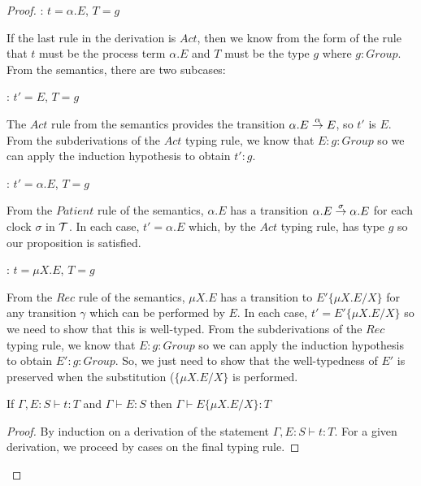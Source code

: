\begin{proof}
: $t = \alpha.E$, $T = g$

\noindent If the last rule in the derivation is $Act$, then we know
from the form of the rule that $t$ must be the process term
$\alpha.E$ and $T$ must be the type $g$ where $g : Group$.  From
the semantics, there are two subcases:

: $t' = E$, $T = g$

\noindent The $Act$ rule from the semantics provides the transition $\alpha.E
\stackrel{\alpha}{\rightarrow} E$, so $t'$ is $E$.  From the subderivations of the
$Act$ typing rule, we know that $E : g : Group$ so we can apply the
induction hypothesis to obtain $t' : g$.

: $t' = \alpha.E$, $T = g$

\noindent From the $Patient$ rule of the semantics, $\alpha.E$ has a transition
$\alpha.E \stackrel{\sigma}{\rightarrow} \alpha.E$ for each clock $\sigma$ in
$\text{$\mathcal{T}$}$.  In each case, $t' = \alpha.E$ which, by the $Act$ typing
rule, has type $g$ so our proposition is satisfied.

: $t = \mu X.E$, $T = g$

\noindent From the $Rec$ rule of the semantics, $\mu X.E$ has a
transition to $E'\{\mu X.E/X\}$ for any transition $\gamma$ which can
be performed by $E$.  In each case, $t' = E'\{\mu X.E/X\}$ so we need
to show that this is well-typed.  From the subderivations of the $Rec$
typing rule, we know that $E : g : Group$ so we can apply the
induction hypothesis to obtain $E' : g : Group$.  So, we just need to
show that the well-typedness of $E'$ is preserved when the
substitution ($\{\mu X.E/X\}$ is performed.

\begin{lemma}
If $\Gamma, E : S \vdash t : T$ and $\Gamma \vdash E : S$ then $\Gamma \vdash E\{\mu X.E/X\} : T$
\end{lemma}

\begin{proof}
By induction on a derivation of the statement $\Gamma, E : S \vdash t
: T$.  For a given derivation, we proceed by cases on the final typing
rule.
\end{proof}

\end{proof}


